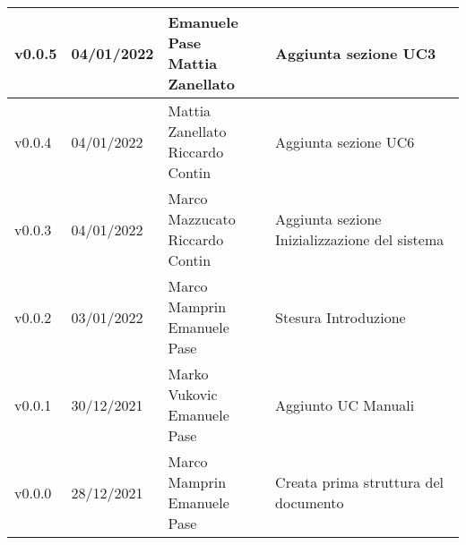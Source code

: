 \begin{center}
\begin{longtable}{|p{2cm}|p{2cm}|p{4cm}|p{5cm}|}
    v0.0.5            & 04/01/2022    & \aCapo{Emanuele Pase\\Mattia Zanellato}    & Aggiunta sezione UC3                            \\ \hline
    v0.0.4            & 04/01/2022    & \aCapo{Mattia Zanellato\\Riccardo Contin}  & Aggiunta sezione UC6                            \\ \hline
    v0.0.3            & 04/01/2022    & \aCapo{Marco Mazzucato\\Riccardo Contin}   & Aggiunta sezione Inizializzazione del sistema   \\ \hline
    v0.0.2            & 03/01/2022    & \aCapo{Marco Mamprin\\Emanuele Pase}       & Stesura Introduzione                            \\ \hline
    v0.0.1            & 30/12/2021    & \aCapo{Marko Vukovic\\Emanuele Pase}       & Aggiunto UC Manuali                             \\ \hline
    v0.0.0            & 28/12/2021    & \aCapo{Marco Mamprin\\Emanuele Pase}       & Creata prima struttura del documento            \\ \hline

  \end{longtable}
\end{center}
